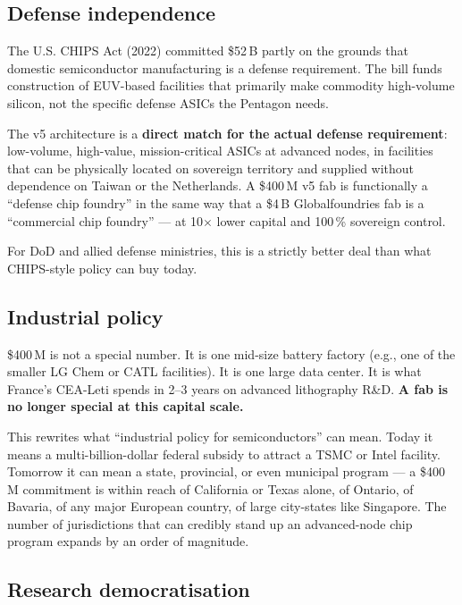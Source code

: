 \documentclass[11pt,letterpaper]{article}
\begin{document}
\subsection{Defense independence}

The U.S. CHIPS Act (2022) committed \$52\,B partly on the grounds that domestic semiconductor manufacturing is a defense requirement. The bill funds construction of EUV-based facilities that primarily make commodity high-volume silicon, not the specific defense ASICs the Pentagon needs.

The v5 architecture is a \textbf{direct match for the actual defense requirement}: low-volume, high-value, mission-critical ASICs at advanced nodes, in facilities that can be physically located on sovereign territory and supplied without dependence on Taiwan or the Netherlands. A \$400\,M v5 fab is functionally a ``defense chip foundry'' in the same way that a \$4\,B Globalfoundries fab is a ``commercial chip foundry'' --- at 10$\times$ lower capital and 100\,\% sovereign control.

For DoD and allied defense ministries, this is a strictly better deal than what CHIPS-style policy can buy today.

\subsection{Industrial policy}

\$400\,M is not a special number. It is one mid-size battery factory (e.g., one of the smaller LG Chem or CATL facilities). It is one large data center. It is what France's CEA-Leti spends in 2--3 years on advanced lithography R\&D. \textbf{A fab is no longer special at this capital scale.}

This rewrites what ``industrial policy for semiconductors'' can mean. Today it means a multi-billion-dollar federal subsidy to attract a TSMC or Intel facility. Tomorrow it can mean a state, provincial, or even municipal program --- a \$400\,M commitment is within reach of California or Texas alone, of Ontario, of Bavaria, of any major European country, of large city-states like Singapore. The number of jurisdictions that can credibly stand up an advanced-node chip program expands by an order of magnitude.

\subsection{Research democratisation}
\end{document}
